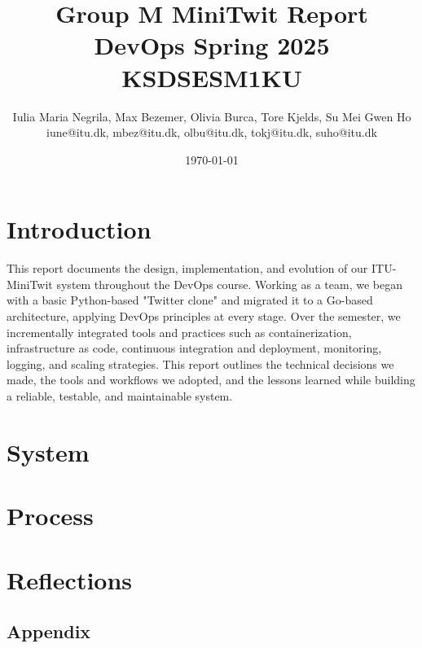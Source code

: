 \documentclass[10pt,a4paper]{article}
\title{Group M MiniTwit Report \\ DevOps Spring 2025 KSDSESM1KU}
\author{Iulia Maria Negrila, Max Bezemer, Olivia Burca, Tore Kjelds, Su Mei Gwen Ho \\ iune@itu.dk, mbez@itu.dk, olbu@itu.dk, tokj@itu.dk, suho@itu.dk}
\date{\today}
\begin{document}
\maketitle
\tableofcontents
\newpage
\section{Introduction}
This report documents the design, implementation, and evolution of our ITU-MiniTwit system throughout the DevOps course. Working as a team, we began with a basic Python-based "Twitter clone" and migrated it to a Go-based architecture, applying DevOps principles at every stage. Over the semester, we incrementally integrated tools and practices such as containerization, infrastructure as code, continuous integration and deployment, monitoring, logging, and scaling strategies. This report outlines the technical decisions we made, the tools and workflows we adopted, and the lessons learned while building a reliable, testable, and maintainable system.

\section{System}


\clearpage
\section{Process}


\clearpage
\section{Reflections}


\begin{appendices}
\section{Appendix}

\end{appendices}
\end{document}
